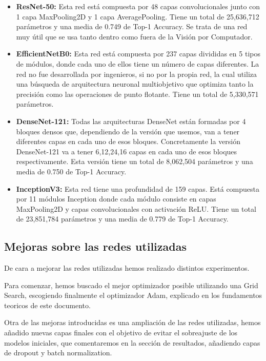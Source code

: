 \begin{itemize}


\item{\textbf{ResNet-50:} Esta red está compuesta por 48 capas convolucionales junto con 1 capa MaxPooling2D y 1 capa AveragePooling. Tiene un total de 25,636,712 parámetros y una media de 0.749 de Top-1 Accuracy. Se trata de una red muy útil que se usa tanto dentro como fuera de la Visión por Computador.}


\item{\textbf{EfficientNetB0:} Esta red está compuesta por 237 capas divididas en 5 tipos de módulos, donde cada uno de ellos tiene un número de capas diferentes. La red no fue desarrollada por ingenieros, si no por la propia red, la cual utiliza una búsqueda de arquitectura neuronal multiobjetivo que optimiza tanto la precisión como las operaciones de punto flotante. Tiene un total de 5,330,571 parámetros.}

\item{\textbf{DenseNet-121:} Todas las arquitecturas DenseNet están formadas por 4 bloques densos que, dependiendo de la versión que usemos, van a tener diferentes capas en cada uno de esos bloques. Concretamente la versión DenseNet-121 va a tener 6,12,24,16 capas en cada uno de esos bloques respectivamente. Esta versión tiene un total de 8,062,504 parámetros y una media de 0.750 de Top-1 Accuracy.}


\item{\textbf{InceptionV3:} Esta red tiene una profundidad de 159 capas. Está compuesta por 11 módulos Inception donde cada módulo consiste en capas MaxPooling2D y capas convolucionales con activación ReLU. Tiene un total de 23,851,784 parámetros y una media de 0.779 de Top-1 Accuracy.}


\end{itemize}

\newpage

\subsection{Mejoras sobre las redes utilizadas}

De cara a mejorar las redes utilizadas hemos realizado distintos experimentos.

Para comenzar, hemos buscado el mejor optimizador posible utilizando una Grid Search, escogiendo finalmente el optimizador Adam, explicado en los fundamentos teoricos de este documento.

Otra de las mejoras introducidas es una ampliación de las redes utilizadas, hemos añadido nuevas capas finales con el objetivo de evitar el sobreajuste de los modelos iniciales, que comentaremos en la sección de resultados, añadiendo capas de dropout y batch normalization.

